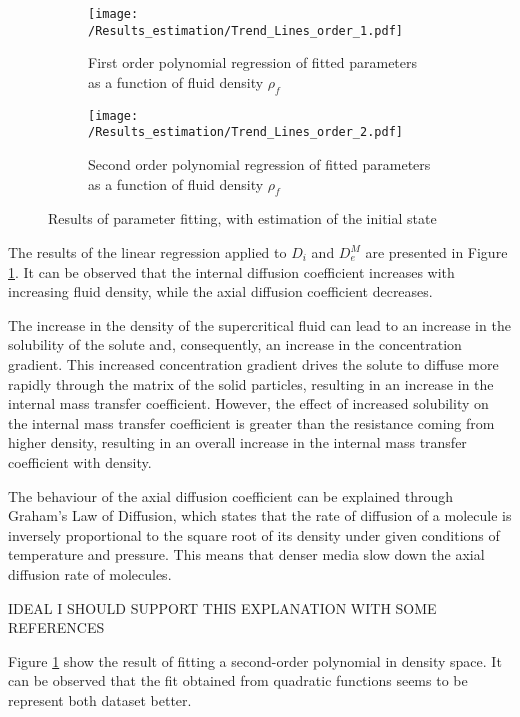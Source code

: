 \documentclass[../Article_Model_Parameters.tex]{subfiles}
\begin{document}
	\begin{figure}[!h]
	\centering
	\begin{subfigure}[b]{\columnwidth}
		\centering
		\texttt{[image: /Results\_estimation/Trend\_Lines\_order\_1.pdf]}
		\caption{First order polynomial regression of fitted parameters as a function of fluid density $\rho_f$}
		\label{fig:Regression_1}
	\end{subfigure}
	\begin{subfigure}[b]{\columnwidth}
		\centering
		\texttt{[image: /Results\_estimation/Trend\_Lines\_order\_2.pdf]}
		\caption{Second order polynomial regression of fitted parameters as a function of fluid density $\rho_f$}
		\label{fig:Regression_2}
	\end{subfigure}
	\caption{Results of parameter fitting, with estimation of the initial state} 
	\label{fig:Regression}
	\end{figure}

	The results of the linear regression applied to $D_i$ and $D_e^M$ are presented in Figure \ref{fig:Regression_1}. It can be observed that the internal diffusion coefficient increases with increasing fluid density, while the axial diffusion coefficient decreases.
	
	The increase in the density of the supercritical fluid can lead to an increase in the solubility of the solute and, consequently, an increase in the concentration gradient. This increased concentration gradient drives the solute to diffuse more rapidly through the matrix of the solid particles, resulting in an increase in the internal mass transfer coefficient. However, the effect of increased solubility on the internal mass transfer coefficient is greater than the resistance coming from higher density, resulting in an overall increase in the internal mass transfer coefficient with density.
	
	The behaviour of the axial diffusion coefficient can be explained through Graham’s Law of Diffusion, which states that the rate of diffusion of a molecule is inversely proportional to the square root of its density under given conditions of temperature and pressure. This means that denser media slow down the axial diffusion rate of molecules. 
	
	{\color{red}IDEAL I SHOULD SUPPORT THIS EXPLANATION WITH SOME REFERENCES}
	
	Figure \ref{fig:Regression_1} show the result of fitting a second-order polynomial in density space. It can be observed that the fit obtained from quadratic functions seems to be represent both dataset better. 
	
	
\end{document}

